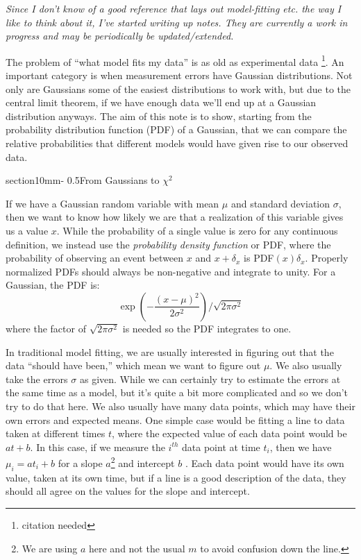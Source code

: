 \documentclass[letterpaper,11pt,preprint]{aastex}
\makeatletter
\renewcommand{\section}{\@startsection%
{section}{1}{0mm}{-\baselineskip}%
{0.5\baselineskip}{\normalfont\Large\bfseries}}%
\makeatother
\begin{document}
\pagestyle{plain}

{\textit{Since I don't know of a good reference that lays out
    model-fitting etc. the way I like to think about it,
    I've started writing up notes.  They are currently a work in
    progress and may be periodically be updated/extended.}


The problem of ``what model fits my data'' is as old as
experimental data \footnote{citation needed}.  An important category
is when measurement errors have Gaussian distributions.  Not only are
Gaussians some of the easiest distributions to work with, but due to
the central limit theorem, if we have enough data we'll end up at a
Gaussian distribution anyways.  The aim of this note is to show,
starting from the probability distribution function (PDF) of a
Gaussian, that we can compare the relative probabilities that
different models would have given rise to our observed data.



\section{From Gaussians to $\chi^2$}

If we have a Gaussian random variable with mean $\mu$ and standard
deviation $\sigma$, then we want to know how likely we are that a
realization of this variable gives us a value $x$.  While the
probability of a single value is zero for any continuous definition,
we instead use the {\textit{probability density function}} or PDF,
where the probability of observing an event between $x$ and
$x+\delta_x$ is PDF$(x)\delta_x$.  Properly normalized PDFs should
always be non-negative and integrate to unity.  For a Gaussian, the
PDF is:
$$\exp(-\frac{(x-\mu)^2}{2\sigma^2})/\sqrt{2\pi\sigma^2}$$
where the factor of $\sqrt{2\pi\sigma^2}$ is needed so the PDF
integrates to one.

In traditional model fitting, we are usually interested in figuring
out that the data ``should have been,'' which mean we want to figure
out $\mu$.  We also usually take the errors $\sigma$ as given.  While
we can certainly try to estimate the errors at the same time as a
model, but it's quite a bit more complicated and so we don't try to do
that here.  We also usually have many data points, which may have
their own errors and expected means.  One simple case would be fitting
a line to data taken at different times $t$, where the expected value
of each data point would be $at+b$.  In this case, if we measure the
$i^{th}$ data point at time $t_i$, then we have $\mu_i=at_i+b$ for a
slope $a$\footnote{We are using $a$ here and not the usual $m$ to
  avoid confusion down the line.} and intercept $b$ .  Each
data point would have its own value, taken at its own time, but if a
line is a good description of the data, they should all agree on the
values for the slope and intercept.  

}
\end{document}
